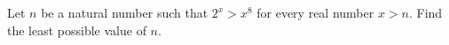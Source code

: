 Let $n$ be a natural number such that $2^x>x^8$ for every real number $x>n$. Find the least possible value of $n$.
